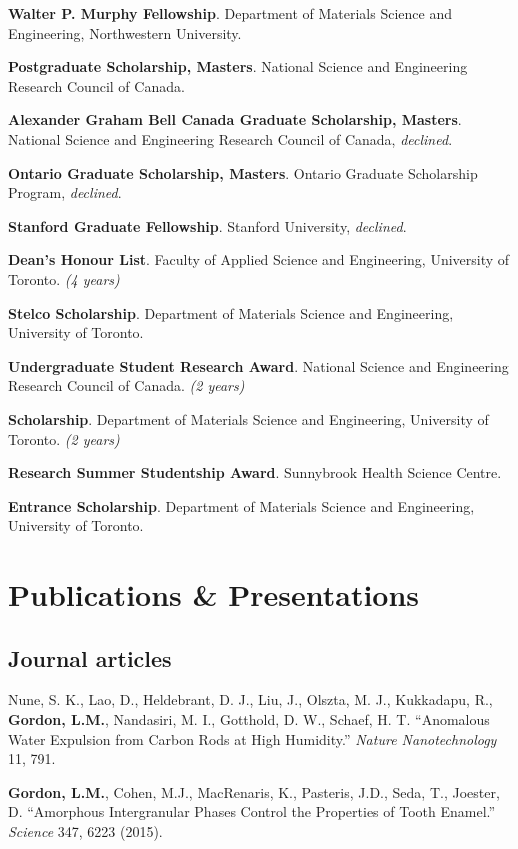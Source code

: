 \textbf{Walter P. Murphy Fellowship}. Department of Materials Science and Engineering, Northwestern University.

\textbf{Postgraduate Scholarship, Masters}. National Science and Engineering Research Council of Canada.

\textbf{Alexander Graham Bell Canada Graduate Scholarship, Masters}. National Science and Engineering Research Council of Canada, \emph{declined}.

\textbf{Ontario Graduate Scholarship, Masters}. Ontario Graduate Scholarship Program, \emph{declined}.

\textbf{Stanford Graduate Fellowship}. Stanford University, \emph{declined}.

\textbf{Dean's Honour List}. Faculty of Applied Science and Engineering, University of Toronto. \emph{(4 years)}

\textbf{Stelco Scholarship}. Department of Materials Science and Engineering, University of Toronto.

\textbf{Undergraduate Student Research Award}. National Science and Engineering Research Council of Canada. \emph{(2 years)}

\textbf{Scholarship}. Department of Materials Science and Engineering, University of Toronto. \emph{(2 years)}

\textbf{Research Summer Studentship Award}. Sunnybrook Health Science Centre.

\textbf{Entrance Scholarship}. Department of Materials Science and Engineering, University of Toronto.
\endgroup

\section*{Publications \& Presentations}

\subsection*{Journal articles}
Nune, S. K., Lao, D., Heldebrant, D. J., Liu, J., Olszta, M. J., Kukkadapu, R., \textbf{Gordon, L.M.}, Nandasiri, M. I., Gotthold, D. W., Schaef, H. T. “Anomalous Water Expulsion from Carbon Rods at High Humidity.” \emph{Nature Nanotechnology} 11, 791.
\begingroup\setlength{\parskip}{0.15cm}

\textbf{Gordon, L.M.}, Cohen, M.J., MacRenaris, K., Pasteris, J.D., Seda, T., Joester, D. “Amorphous Intergranular Phases Control the Properties of Tooth Enamel.” \emph{Science} 347, 6223 (2015).

